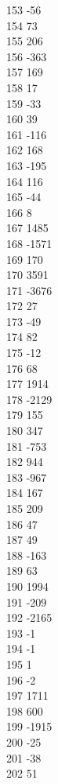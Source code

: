 { 153	-56 \\
 154	73 \\
 155	206 \\
 156	-363 \\
 157	169 \\
 158	17 \\
 159	-33 \\
 160	39 \\
 161	-116 \\
 162	168 \\
 163	-195 \\
 164	116 \\
 165	-44 \\
 166	8 \\
 167	1485 \\
 168	-1571 \\
 169	170 \\
 170	3591 \\
 171	-3676 \\
 172	27 \\
 173	-49 \\
 174	82 \\
 175	-12 \\
 176	68 \\
 177	1914 \\
 178	-2129 \\
 179	155 \\
 180	347 \\
 181	-753 \\
 182	944 \\
 183	-967 \\
 184	167 \\
 185	209 \\
 186	47 \\
 187	49 \\
 188	-163 \\
 189	63 \\
 190	1994 \\
 191	-209 \\
 192	-2165 \\
 193	-1 \\
 194	-1 \\
 195	1 \\
 196	-2 \\
 197	1711 \\
 198	600 \\
 199	-1915 \\
 200	-25 \\
 201	-38 \\
 202	51 \\
}
